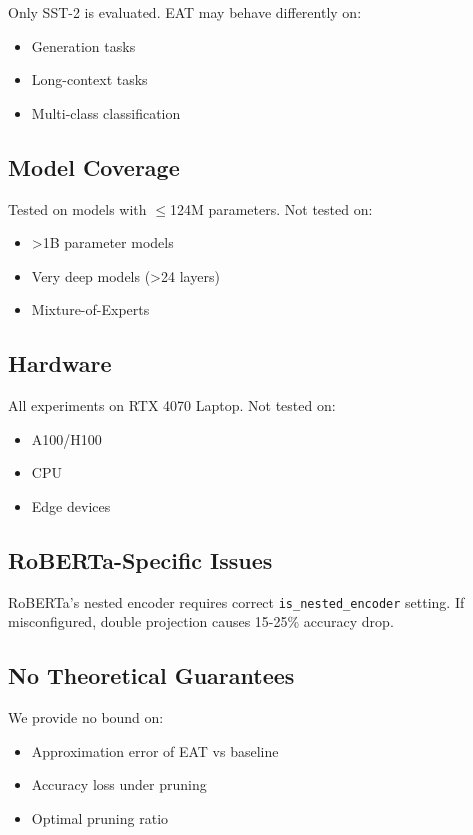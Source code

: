 Only SST-2 is evaluated. EAT may behave differently on:

\begin{itemize}
\item Generation tasks
\item Long-context tasks
\item Multi-class classification

\end{itemize}
\subsection{Model Coverage}

Tested on models with $\le$124M parameters. Not tested on:

\begin{itemize}
\item \textgreater{}1B parameter models
\item Very deep models (\textgreater{}24 layers)
\item Mixture-of-Experts

\end{itemize}
\subsection{Hardware}

All experiments on RTX 4070 Laptop. Not tested on:

\begin{itemize}
\item A100/H100
\item CPU
\item Edge devices

\end{itemize}
\subsection{RoBERTa-Specific Issues}

RoBERTa's nested encoder requires correct \texttt{is\_nested\_encoder} setting. If 
misconfigured, double projection causes 15-25\% accuracy drop.

\subsection{No Theoretical Guarantees}

We provide no bound on:

\begin{itemize}
\item Approximation error of EAT vs baseline
\item Accuracy loss under pruning
\item Optimal pruning ratio

\end{itemize}
